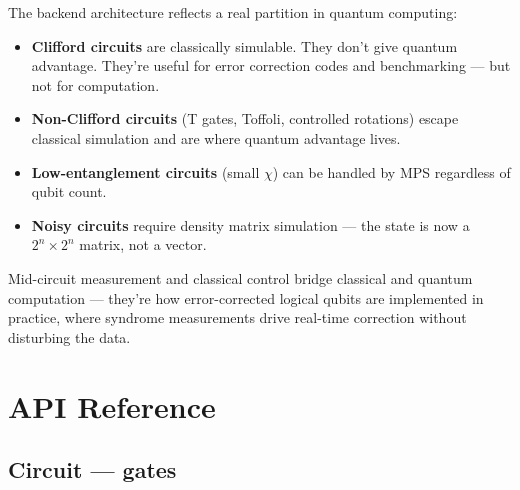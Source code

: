 \documentclass[
  11pt,
  letterpaper,
  oneside]{scrbook}
\providecommand{\tightlist}{%
  \setlength{\itemsep}{0pt}\setlength{\parskip}{0pt}}
\begin{document}
The backend architecture reflects a real partition in quantum computing:

\begin{itemize}
\tightlist
\item
  \textbf{Clifford circuits} are classically simulable. They don't give
  quantum advantage. They're useful for error correction codes and
  benchmarking --- but not for computation.
\item
  \textbf{Non-Clifford circuits} (T gates, Toffoli, controlled
  rotations) escape classical simulation and are where quantum advantage
  lives.
\item
  \textbf{Low-entanglement circuits} (small \(\chi\)) can be handled by
  MPS regardless of qubit count.
\item
  \textbf{Noisy circuits} require density matrix simulation --- the
  state is now a \(2^n \times 2^n\) matrix, not a vector.
\end{itemize}

Mid-circuit measurement and classical control bridge classical and
quantum computation --- they're how error-corrected logical qubits are
implemented in practice, where syndrome measurements drive real-time
correction without disturbing the data.


\chapter*{API Reference}\label{sec-appendix}


\section*{Circuit --- gates}\label{circuit-gates}

\end{document}
